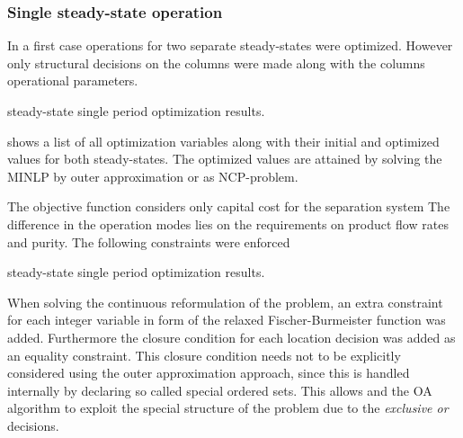     \subsubsection{Single steady-state operation}
    In a first case operations for two separate steady-states were optimized. However only structural
    decisions on the columns were made along with the columns operational parameters.
    \begin{table}
        \center
        \footnotesize
        
        \caption{steady-state single period optimization results.}
        \label{tab:ss1_results}
    \end{table}
     shows a list of all optimization variables along with their initial and optimized values
    for both steady-states. The optimized values are attained by solving the MINLP by outer approximation or as NCP-problem.

    The objective function considers only capital cost for the separation system
    The difference in the operation modes lies on the requirements on product flow rates and purity. The following
    constraints were enforced
    \begin{table}
        \center
        \footnotesize
        
        \caption{steady-state single period optimization results.}
        \label{tab:ss1_results}
    \end{table}
    When solving the continuous reformulation of the problem, an extra constraint for each integer variable in form of the
    relaxed Fischer-Burmeister function was added. Furthermore the closure condition for each location decision was added as
    an equality constraint. This closure condition needs not to be explicitly considered using the outer approximation approach,
    since this is handled internally by declaring so called special ordered sets. This allows \gproms and the OA algorithm
    to exploit the special structure of the problem due to the \emph{exclusive or} decisions.

